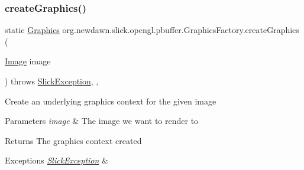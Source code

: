 \subsubsection{\texorpdfstring{create\+Graphics()}{createGraphics()}}
{\footnotesize\ttfamily static \mbox{\hyperlink{classorg_1_1newdawn_1_1slick_1_1_graphics}{Graphics}} org.\+newdawn.\+slick.\+opengl.\+pbuffer.\+Graphics\+Factory.\+create\+Graphics (\begin{DoxyParamCaption}\item[{\mbox{\hyperlink{classorg_1_1newdawn_1_1slick_1_1_image}{Image}}}]{image }\end{DoxyParamCaption}) throws \mbox{\hyperlink{classorg_1_1newdawn_1_1slick_1_1_slick_exception}{Slick\+Exception}}\hspace{0.3cm}{\ttfamily [inline]}, {\ttfamily [static]}, {\ttfamily [private]}}

Create an underlying graphics context for the given image


\begin{DoxyParams}{Parameters}
{\em image} & The image we want to render to \\
\hline
\end{DoxyParams}
\begin{DoxyReturn}{Returns}
The graphics context created 
\end{DoxyReturn}

\begin{DoxyExceptions}{Exceptions}
{\em \mbox{\hyperlink{classorg_1_1newdawn_1_1slick_1_1_slick_exception}{Slick\+Exception}}} & \\
\hline
\end{DoxyExceptions}

